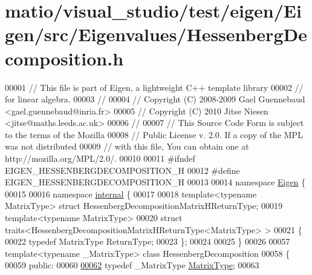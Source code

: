 \hypertarget{matio_2visual__studio_2test_2eigen_2_eigen_2src_2_eigenvalues_2_hessenberg_decomposition_8h_source}{}\section{matio/visual\+\_\+studio/test/eigen/\+Eigen/src/\+Eigenvalues/\+Hessenberg\+Decomposition.h}
\label{matio_2visual__studio_2test_2eigen_2_eigen_2src_2_eigenvalues_2_hessenberg_decomposition_8h_source}

\begin{DoxyCode}
00001 \textcolor{comment}{// This file is part of Eigen, a lightweight C++ template library}
00002 \textcolor{comment}{// for linear algebra.}
00003 \textcolor{comment}{//}
00004 \textcolor{comment}{// Copyright (C) 2008-2009 Gael Guennebaud <gael.guennebaud@inria.fr>}
00005 \textcolor{comment}{// Copyright (C) 2010 Jitse Niesen <jitse@maths.leeds.ac.uk>}
00006 \textcolor{comment}{//}
00007 \textcolor{comment}{// This Source Code Form is subject to the terms of the Mozilla}
00008 \textcolor{comment}{// Public License v. 2.0. If a copy of the MPL was not distributed}
00009 \textcolor{comment}{// with this file, You can obtain one at http://mozilla.org/MPL/2.0/.}
00010 
00011 \textcolor{preprocessor}{#ifndef EIGEN\_HESSENBERGDECOMPOSITION\_H}
00012 \textcolor{preprocessor}{#define EIGEN\_HESSENBERGDECOMPOSITION\_H}
00013 
00014 \textcolor{keyword}{namespace }\hyperlink{namespace_eigen}{Eigen} \{ 
00015 
00016 \textcolor{keyword}{namespace }\hyperlink{namespaceinternal}{internal} \{
00017   
00018 \textcolor{keyword}{template}<\textcolor{keyword}{typename} MatrixType> \textcolor{keyword}{struct }HessenbergDecompositionMatrixHReturnType;
00019 \textcolor{keyword}{template}<\textcolor{keyword}{typename} MatrixType>
00020 \textcolor{keyword}{struct }traits<HessenbergDecompositionMatrixHReturnType<MatrixType> >
00021 \{
00022   \textcolor{keyword}{typedef} MatrixType ReturnType;
00023 \};
00024 
00025 \}
00026 
00057 \textcolor{keyword}{template}<\textcolor{keyword}{typename} \_MatrixType> \textcolor{keyword}{class }HessenbergDecomposition
00058 \{
00059   \textcolor{keyword}{public}:
00060 
\hyperlink{group___eigenvalues___module_a93a611350a7db9d1da18f2c828ecea9f}{00062}     \textcolor{keyword}{typedef} \_MatrixType \hyperlink{group___eigenvalues___module_a93a611350a7db9d1da18f2c828ecea9f}{MatrixType};
00063 

\end{DoxyCode}
